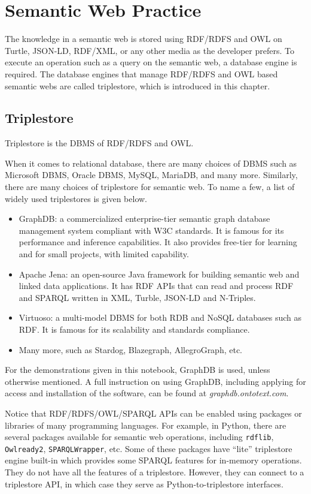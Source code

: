 \chapter{Semantic Web Practice} \label{ch:semanticwebpractice}

The knowledge in a semantic web is stored using RDF/RDFS and OWL on Turtle, JSON-LD, RDF/XML, or any other media as the developer prefers. To execute an operation such as a query on the semantic web, a database engine is required. The database engines that manage RDF/RDFS and OWL based semantic webs are called triplestore, which is introduced in this chapter.

\section{Triplestore}

Triplestore is the DBMS of RDF/RDFS and OWL. 

When it comes to relational database, there are many choices of DBMS such as Microsoft DBMS, Oracle DBMS, MySQL, MariaDB, and many more. Similarly, there are many choices of triplestore for semantic web. To name a few, a list of widely used triplestores is given below.
\begin{itemize}
	\item GraphDB: a commercialized enterprise-tier semantic graph database management system compliant with W3C standards. It is famous for its performance and inference capabilities. It also provides free-tier for learning and for small projects, with limited capability.
	\item Apache Jena: an open-source Java framework for building semantic web and linked data applications. It has RDF APIs that can read and process RDF and SPARQL written in XML, Turble, JSON-LD and N-Triples.
	\item Virtuoso: a multi-model DBMS for both RDB and NoSQL databases such as RDF. It is famous for its scalability and standards compliance.
	\item Many more, such as Stardog, Blazegraph, AllegroGraph, etc.
\end{itemize}

For the demonstrations given in this notebook, GraphDB is used, unless otherwise mentioned. A full instruction on using GraphDB, including applying for access and installation of the software, can be found at \textit{graphdb.ontotext.com}.

Notice that RDF/RDFS/OWL/SPARQL APIs can be enabled using packages or libraries of many programming languages. For example, in Python, there are several packages available for semantic web operations, including \verb|rdflib|, \verb|Owlready2|, \verb|SPARQLWrapper|, etc. Some of these packages have ``lite'' triplestore engine built-in which provides some SPARQL features for in-memory operations. They do not have all the features of a triplestore. However, they can connect to a triplestore API, in which case they serve as Python-to-triplestore interfaces.  

